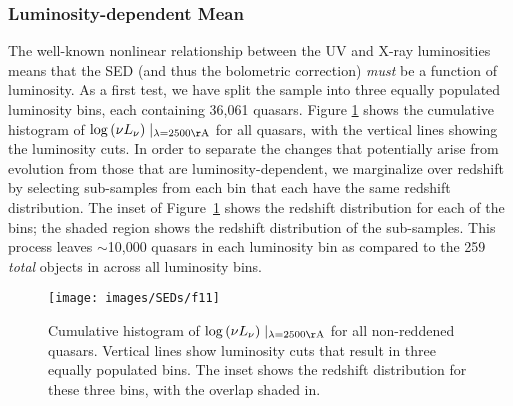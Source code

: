 \subsubsection{Luminosity-dependent Mean} \label{Luminosity SED}

The well-known nonlinear relationship between the UV and X-ray luminosities means that the SED (and thus the bolometric correction) {\em must} be a function of luminosity.  As a first test, we have split the sample into three equally populated luminosity bins, each containing 36,061
quasars.  Figure \ref{cum_hist} shows the cumulative histogram of $\log{(\nu L_{\nu})}\mid_{\lambda=2500{\rm \AA}}$ for all %
quasars, with the vertical lines showing the luminosity cuts.
In order to separate the changes that potentially arise from evolution from those that are luminosity-dependent, we marginalize over redshift by selecting sub-samples from each bin that each have the same redshift distribution.
The inset of Figure~\ref{cum_hist} shows the redshift distribution for each of the bins; the shaded region shows the redshift distribution of the sub-samples.  This process leaves $\sim$10,000 quasars in each luminosity bin as compared to the 259 {\em total} objects in \citet{Richards:2006} across all luminosity bins.  

\begin{figure}[t]
 \centering
 \texttt{[image: images/SEDs/f11]}
 \caption[Luminosity distribution of non-reddened quasars]{Cumulative histogram of $\log{(\nu L_{\nu})}\mid_{\lambda=2500 {\rm \AA}}$ for all non-reddened quasars. Vertical lines show luminosity cuts that result in three equally populated bins. The inset shows the redshift distribution for these three bins, with the overlap shaded in.}
 \label{cum_hist}
\end{figure}

